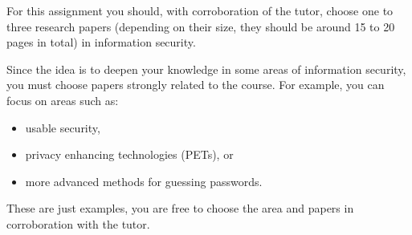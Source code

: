 For this assignment you should, with corroboration of the tutor, choose one to 
three research papers (depending on their size, they should be around 15 to 20 
pages in total) in information security.

Since the idea is to deepen your knowledge in some areas of information 
security, you must choose papers strongly related to the course.
For example, you can focus on areas such as:
\begin{itemize}
  \item usable security,
  \item privacy enhancing technologies (PETs), or
  \item more advanced methods for guessing passwords.
\end{itemize}
These are just examples, you are free to choose the area and papers in 
corroboration with the tutor.
